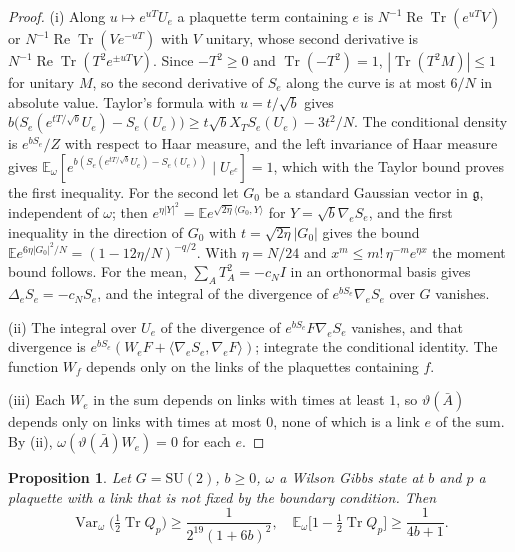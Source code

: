 \documentclass[aps,prd,twocolumn,superscriptaddress,nofootinbib,longbibliography,floatfix,amsmath,amssymb,10pt]{revtex4-2}
\newtheorem{proposition}[theorem]{Proposition}
\theoremstyle{definition}
\theoremstyle{remark}
\newcommand{\E}{\mathbb{E}}
\newcommand{\SU}{\mathrm{SU}}
\newcommand{\g}{\mathfrak{g}}
\newcommand{\Tr}{\operatorname{Tr}}
\newcommand{\ReTr}{\operatorname{Re}\operatorname{Tr}}
\newcommand{\Var}{\operatorname{Var}}
\newcommand{\ip}[2]{\langle #1,#2\rangle}
\begin{document}
\begin{proof}
(i) Along $u\mapsto e^{uT}U_e$ a plaquette term containing $e$ is
$N^{-1}\ReTr(e^{uT}V)$ or $N^{-1}\ReTr(Ve^{-uT})$ with $V$ unitary, whose
second derivative is $N^{-1}\ReTr(T^2e^{\pm uT}V)$. Since $-T^2\ge0$ and
$\Tr(-T^2)=1$, $|\Tr(T^2M)|\le1$ for unitary $M$, so the second derivative of
$S_e$ along the curve is at most $6/N$ in absolute value. Taylor's formula with
$u=t/\sqrt b$ gives
$b\bigl(S_e(e^{tT/\sqrt b}U_e)-S_e(U_e)\bigr)\ge t\sqrt bX_TS_e(U_e)-3t^2/N$.
The conditional density is $e^{bS_e}/Z$ with respect to Haar measure, and the
left invariance of Haar measure gives
$\E_\omega[e^{b(S_e(e^{tT/\sqrt b}U_e)-S_e(U_e))}\mid U_{e^c}]=1$, which with
the Taylor bound proves the first inequality. For the second let $G_0$ be a
standard Gaussian vector in $\g$, independent of $\omega$; then
$e^{\eta|Y|^2}=\E e^{\sqrt{2\eta}\ip{G_0}Y}$ for $Y=\sqrt b\nabla_eS_e$, and the
first inequality in the direction of $G_0$ with $t=\sqrt{2\eta}|G_0|$ gives
the bound $\E e^{6\eta|G_0|^2/N}=(1-12\eta/N)^{-q/2}$. With $\eta=N/24$ and
$x^m\le m!\,\eta^{-m}e^{\eta x}$ the moment bound follows. For the mean,
$\sum_AT_A^2=-c_NI$ in an orthonormal basis gives $\Delta_eS_e=-c_NS_e$, and the
integral of the divergence of $e^{bS_e}\nabla_eS_e$ over $G$ vanishes.

(ii) The integral over $U_e$ of the divergence of $e^{bS_e}F\nabla_eS_e$
vanishes, and that divergence is $e^{bS_e}(W_eF+\ip{\nabla_eS_e}{\nabla_eF})$;
integrate the conditional identity. The function $W_f$ depends only on the
links of the plaquettes containing $f$.

(iii) Each $W_e$ in the sum depends on links with times at least $1$, so
$\vartheta(\bar A)$ depends only on links with times at most $0$, none of which
is a link $e$ of the sum. By (ii), $\omega(\vartheta(\bar A)W_e)=0$ for each $e$.
\end{proof}

\begin{proposition}\label{prop:plaqvar}
Let $G=\SU(2)$, $b\ge0$, $\omega$ a Wilson Gibbs state at $b$ and $p$ a
plaquette with a link that is not fixed by the boundary condition. Then
\[
\Var_\omega\bigl(\tfrac12\Tr Q_p\bigr)\ge\frac1{2^{19}(1+6b)^2},\quad
\E_\omega\bigl[1-\tfrac12\Tr Q_p\bigr]\ge\frac1{4b+1}.
\]
\end{proposition}
\end{document}
